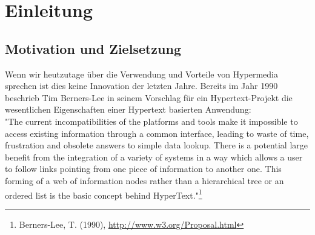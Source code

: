 \newpage
\section{Einleitung}
\subsection{Motivation und Zielsetzung}
Wenn wir heutzutage über die Verwendung und Vorteile von Hypermedia sprechen ist dies keine Innovation der letzten Jahre. Bereits im Jahr 1990 beschrieb Tim Berners-Lee in seinem Vorschlag für ein Hypertext-Projekt die wesentlichen Eigenschaften einer Hypertext basierten Anwendung:\\

"The current incompatibilities of the platforms and tools make it impossible to access existing information through a common interface, leading to waste of time, frustration and obsolete answers to simple data lookup. There is a potential large benefit from the integration of a variety of systems in a way which allows a user to follow links pointing from one piece of information to another one. This forming of a web of information nodes rather than a hierarchical tree or an ordered list is the basic concept behind HyperText."\footnote{Berners-Lee, T. (1990), \url{http://www.w3.org/Proposal.html}}\\

